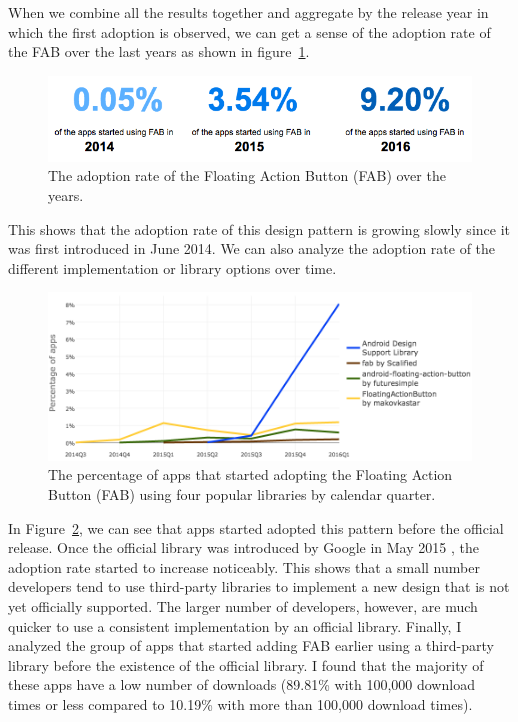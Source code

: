 \noindent When we combine all the results together and aggregate by the release year in which the first adoption is observed, we can get a sense of the adoption rate of the FAB over the last years as shown in figure~\ref{fig:fab_years}.
\begin{figure}[h]
	\includegraphics[scale=0.6]{figures/findings/fab_over_years.png}
	\caption{The adoption rate of the Floating Action Button (FAB) over the years.}
	\label{fig:fab_years}
\end{figure}
This shows that the adoption rate of this design pattern is growing slowly since it was first introduced in June 2014.
We can also analyze the adoption rate of the different implementation or library options over time.
\begin{figure}[h]
	\includegraphics[scale=0.5]{figures/findings/fab_by_quarter.png}
		\caption{The percentage of apps that started adopting the Floating Action Button (FAB) using four popular libraries by calendar quarter.}
	\label{fig:fab_by_quartert}
\end{figure}
In Figure~\ref{fig:fab_by_quartert}, we can see that apps started adopted this pattern before the official release.
Once the official library was introduced by Google in May 2015 \cite{android_design_support_lib_blog_post}, the adoption rate started to increase noticeably.
This shows that a small number developers tend to use third-party libraries to implement a new design that is not yet officially supported.
The larger number of developers, however, are much quicker to use a consistent implementation by an official library.
Finally, I analyzed the group of apps that started adding FAB earlier using a third-party library before the existence of the official library.
I found that the majority of these apps have a low number of downloads (89.81\% with 100,000 download times or less compared to 10.19\% with more than 100,000 download times).

